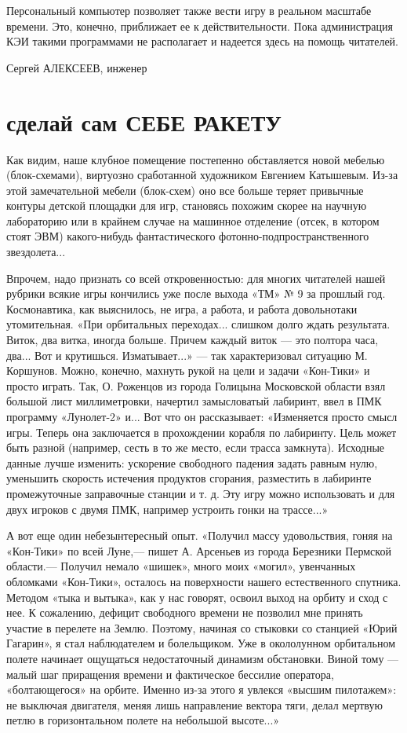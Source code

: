 \documentclass[11pt,a4paper,oneside]{article}
\begin{document}
Персональный компьютер позволяет также вести игру в реальном масштабе времени. Это, конечно, приближает ее к действительности. Пока администрация КЭИ такими программами не располагает и надеется здесь на помощь читателей.

Сергей АЛЕКСЕЕВ, инженер

\section{сделай сам СЕБЕ РАКЕТУ}
Как видим, наше клубное помещение постепенно обставляется новой мебелью (блок-схемами), виртуозно сработанной художником Евгением Катышевым. Из-за этой замечательной мебели (блок-схем) оно все больше теряет привычные контуры детской площадки для игр, становясь похожим скорее на научную лабораторию или в крайнем случае на машинное отделение (отсек, в котором стоят ЭВМ) какого-нибудь фантастического фотонно-подпространственного звездолета...

Впрочем, надо признать со всей откровенностью: для многих читателей нашей рубрики всякие игры кончились уже после выхода «ТМ» № 9 за прошлый год. Космонавтика, как выяснилось, не игра, а работа, и работа довольнотаки утомительная. «При орбитальных переходах... слишком долго ждать результата. Виток, два витка, иногда больше. Причем каждый виток — это полтора часа, два... Вот и крутишься. Изматывает...» — так характеризовал ситуацию М. Коршунов. Можно, конечно, махнуть рукой на цели и задачи «Кон-Тики» и просто играть. Так, О. Роженцов из города Голицына Московской области взял большой лист миллиметровки, начертил замысловатый лабиринт, ввел в ПМК программу «Лунолет-2» и... Вот что он рассказывает: «Изменяется просто смысл игры. Теперь она заключается в прохождении корабля по лабиринту. Цель может быть разной (например, сесть в то же место, если трасса замкнута). Исходные данные лучше изменить: ускорение свободного падения задать равным нулю, уменьшить скорость истечения продуктов сгорания, разместить в лабиринте промежуточные заправочные станции и т. д. Эту игру можно использовать и для двух игроков с двумя ПМК, например устроить гонки на трассе...»

А вот еще один небезынтересный опыт. «Получил массу удовольствия, гоняя на «Кон-Тики» по всей Луне,— пишет А. Арсеньев из города Березники Пермской области.— Получил немало «шишек», много моих «могил», увенчанных обломками «Кон-Тики», осталось на поверхности нашего естественного спутника. Методом «тыка и вытыка», как у нас говорят, освоил выход на орбиту и сход с нее. К сожалению, дефицит свободного времени не позволил мне принять участие в перелете на Землю. Поэтому, начиная со стыковки со станцией «Юрий Гагарин», я стал наблюдателем и болельщиком. Уже в окололунном орбитальном полете начинает ощущаться недостаточный динамизм обстановки. Виной тому — малый шаг приращения времени и фактическое бессилие оператора, «болтающегося» на орбите. Именно из-за этого я увлекся «высшим пилотажем»: не выключая двигателя, меняя лишь направление вектора тяги, делал мертвую петлю в горизонтальном полете на небольшой высоте...»
\end{document}
